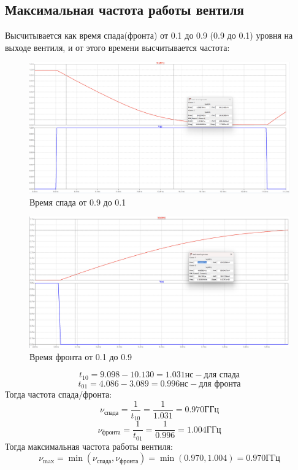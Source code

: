 \documentclass[12pt,onecolumn]{article}
\begin{document}
\subsection{Максимальная частота работы вентиля}
Высчитывается как время спада(фронта) от 0.1 до 0.9 (0.9 до 0.1) уровня на выходе вентиля, и от этого времени высчитывается частота:
\begin{figure}
    \centering
    \includegraphics[width=\textwidth]{image/frequency10.png}
    \caption{Время спада от 0.9 до 0.1}
\end{figure}
\begin{figure}[H]
    \centering
    \includegraphics[width=\textwidth]{image/frequency01.png}
    \caption{Время фронта от 0.1 до 0.9}
\end{figure}
$$
    t_{10} = 9.098 - 10.130 = 1.031 \text{нс} - \text{для спада}
$$
$$t_{01} = 4.086 - 3.089 = 0.996 \text{нс} - \text{для фронта}$$
Тогда частота спада/фронта:
$$
    \nu_{\text{спада}} = \frac{1}{t_{10}} = \frac{1}{1.031} = 0.970 \text{ГГц}
$$
$$
    \nu_{\text{фронта}} = \frac{1}{t_{01}} = \frac{1}{0.996} = 1.004 \text{ГГц}
$$
Тогда максимальная частота работы вентиля:
$$
\nu_{\max} = \min(\nu_{\text{спада}}, \nu_{\text{фронта}}) = \min(0.970, 1.004) = 0.970 \text{ГГц}
$$
\end{document}
